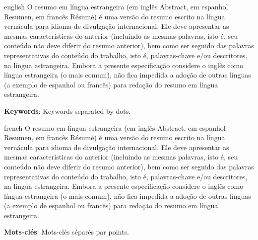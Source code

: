 \documentclass[
    12pt,				%
	oneside,            %
	a4paper,			%
	english,			%
	french,
	spanish,
	brazil				%
	]{abntex2}
\newcommand{\listofquadrosname}{Lista de quadros}
\begin{document}
\begin{resumo}[Abstract]
\vspace{\onelineskip}
\begin{otherlanguage*}{english}
O resumo em língua estrangeira (em inglês Abstract, em espanhol Resumen, em francês Résumé) é uma versão do resumo escrito na língua vernácula para idioma de divulgação internacional. Ele deve apresentar as mesmas características do anterior (incluindo as mesmas palavras, isto é, seu conteúdo não deve diferir do resumo anterior), bem como ser seguido das palavras representativas do conteúdo do trabalho, isto é, palavras-chave e/ou descritores, na língua estrangeira. Embora a presente especificação considere o inglês como língua estrangeira (o mais comum), não fica impedida a adoção de outras línguas (a exemplo de espanhol ou francês) para redação do resumo em língua estrangeira.

\noindent\textbf{Keywords}: Keywords separated by dots.
\end{otherlanguage*}
\end{resumo}

\begin{resumo}[Résumé]
\vspace{\onelineskip}
\begin{otherlanguage*}{french}
O resumo em língua estrangeira (em inglês Abstract, em espanhol Resumen, em francês Résumé) é uma versão do resumo escrito na língua vernácula para idioma de divulgação internacional. Ele deve apresentar as mesmas características do anterior (incluindo as mesmas palavras, isto é, seu conteúdo não deve diferir do resumo anterior), bem como ser seguido das palavras representativas do conteúdo do trabalho, isto é, palavras-chave e/ou descritores, na língua estrangeira. Embora a presente especificação considere o inglês como língua estrangeira (o mais comum), não fica impedida a adoção de outras línguas (a exemplo de espanhol ou francês) para redação do resumo em língua estrangeira.

\noindent\textbf{Mots-clés}: Mots-clés séparés par points.
\end{otherlanguage*}
\end{resumo}

\listoffigures*
\clearpage

\pdfbookmark[0]{\listofquadrosname}{loq}
\listofquadros*
\clearpage

\listoftables*
\clearpage
\end{document}
